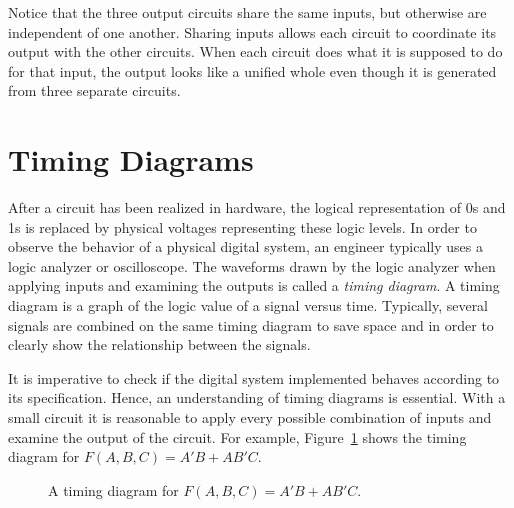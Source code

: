 Notice that the three output circuits share the same inputs, but otherwise
are independent of one another.  Sharing inputs allows each
circuit to coordinate its output with the other circuits.  When
each circuit does what it is supposed to do for that input, the
output looks like a unified whole even though it is generated from
three separate circuits.

\section{Timing Diagrams}
After a circuit has been realized in hardware, the logical
representation of 0s and 1s is replaced by physical voltages
representing these logic levels.  In order to observe the behavior
of a physical digital system, an engineer typically uses a
logic analyzer or oscilloscope.  The waveforms drawn by the logic
analyzer when applying inputs and examining the outputs is called
a {\it timing diagram}.  A timing diagram is a graph of the logic value 
of a signal versus time.  Typically, several signals are combined on the
same timing diagram to save space and in order to clearly 
show the relationship between the signals.

It is imperative to check if the digital system implemented
behaves according to its specification. Hence, an understanding of
timing diagrams is essential.  With a small circuit it is reasonable
to apply every possible combination of inputs and examine the 
output of the circuit.  For example, Figure~\ref{fig:time} shows
the timing diagram for $F(A,B,C) = A'B+AB'C$.

\begin{figure}[ht]
\caption{A timing diagram for $F(A,B,C) = A'B + AB'C$.}
\label{fig:time}
\end{figure}

